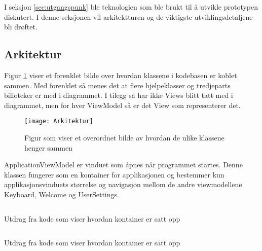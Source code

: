 { 
I seksjon \ref{sec:utgangspunk} ble teknologien som ble brukt til å utvikle prototypen diskutert. I denne seksjonen vil arkitektturen og de viktigste utviklingsdetaljene  bli drøftet.  
 
 
\subsection{Arkitektur} 
 
 
Figur \ref{fig:arkitektur} viser et forenklet bilde over hvordan klassene i kodebasen er koblet sammen. Med forenklet så menes det at flere hjelpeklasser og tredjeparts bilioteker er med i diagrammet. I tilegg så har ikke Views blitt tatt med i diagrammet, men for hver ViewModel så er det View som representerer det.  
 
 

 
\begin{figure}[ht] 
\centering 
\texttt{[image: Arkitektur]} 
\caption{Figur som viser et overordnet bilde av hvordan de ulike klassene henger sammen} 
\label{fig:arkitektur} 
\end{figure} 
 

 
ApplicationViewModel er vinduet som åpnes når programmet startes. Denne klassen fungerer som en kontainer for applikasjonen og bestemmer kun applikasjonsvinduets størrelse og navigasjon mellom de andre viewmodellene Keyboard, Welcome og UserSettings.  
 
 

\begin{listing}[ht] 
\inputminted[fontsize=\footnotesize, frame=lines,framesep=2mm,baselinestretch=1.2,bgcolor=lightgray,linenos]{xml}{Code/ApplicationContainer.xml} 
\caption{Utdrag fra kode som viser hvordan kontainer er satt opp} 
\label{listing:Kontainer} 
\end{listing} 
 
 
\begin{listing}[ht] 
\inputminted[fontsize=\footnotesize, frame=lines,framesep=2mm,baselinestretch=1.2,bgcolor=lightgray,linenos]{csharp}{Code/CurrentApplicationView.cs} 
\caption{Utdrag fra kode som viser hvordan kontainer er satt opp} 
\label{listing:CurrentAppView} 
\end{listing} 
 
 
 
}
